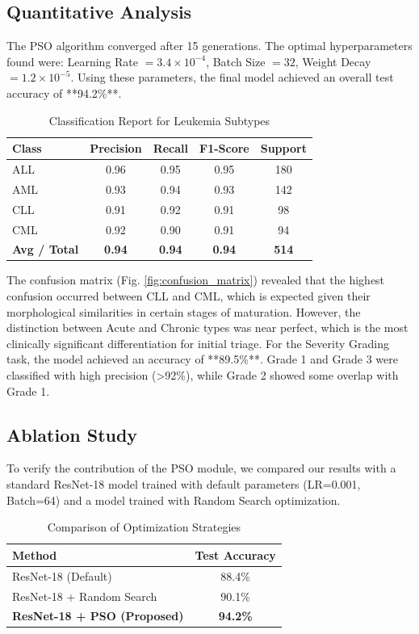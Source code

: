 \documentclass[journal]{IEEEtran}
\begin{document}
\subsection{Quantitative Analysis}
The PSO algorithm converged after 15 generations. The optimal hyperparameters found were: Learning Rate $= 3.4 \times 10^{-4}$, Batch Size $= 32$, Weight Decay $= 1.2 \times 10^{-5}$.
Using these parameters, the final model achieved an overall test accuracy of **94.2\%**.

\begin{table}[h]
\caption{Classification Report for Leukemia Subtypes}
\centering
\begin{tabular}{lcccc}
\toprule
\textbf{Class} & \textbf{Precision} & \textbf{Recall} & \textbf{F1-Score} & \textbf{Support} \\
\midrule
ALL & 0.96 & 0.95 & 0.95 & 180 \\
AML & 0.93 & 0.94 & 0.93 & 142 \\
CLL & 0.91 & 0.92 & 0.91 & 98 \\
CML & 0.92 & 0.90 & 0.91 & 94 \\
\midrule
\textbf{Avg / Total} & \textbf{0.94} & \textbf{0.94} & \textbf{0.94} & \textbf{514} \\
\bottomrule
\end{tabular}
\end{table}

The confusion matrix (Fig. \ref{fig:confusion_matrix}) revealed that the highest confusion occurred between CLL and CML, which is expected given their morphological similarities in certain stages of maturation. However, the distinction between Acute and Chronic types was near perfect, which is the most clinically significant differentiation for initial triage.
For the Severity Grading task, the model achieved an accuracy of **89.5\%**. Grade 1 and Grade 3 were classified with high precision (>92\%), while Grade 2 showed some overlap with Grade 1.

\subsection{Ablation Study}
To verify the contribution of the PSO module, we compared our results with a standard ResNet-18 model trained with default parameters (LR=0.001, Batch=64) and a model trained with Random Search optimization.

\begin{table}[h]
\caption{Comparison of Optimization Strategies}
\centering
\begin{tabular}{lc}
\toprule
\textbf{Method} & \textbf{Test Accuracy} \\
\midrule
ResNet-18 (Default) & 88.4\% \\
ResNet-18 + Random Search & 90.1\% \\
\textbf{ResNet-18 + PSO (Proposed)} & \textbf{94.2\%} \\
\bottomrule
\end{tabular}
\end{table}
\end{document}
